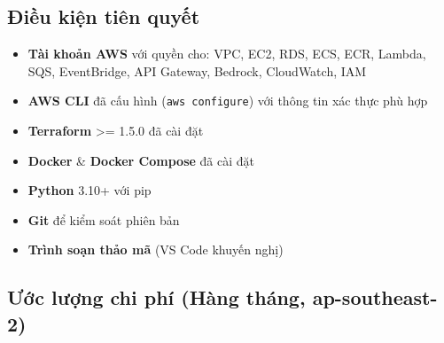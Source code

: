 \hypertarget{ux111iux1ec1u-kiux1ec7n-tiuxean-quyux1ebft}{%
\subsection{Điều kiện tiên
quyết}}

\begin{itemize}
\tightlist
\item
  \textbf{Tài khoản AWS} với quyền cho: VPC, EC2, RDS, ECS, ECR, Lambda,
  SQS, EventBridge, API Gateway, Bedrock, CloudWatch, IAM
\item
  \textbf{AWS CLI} đã cấu hình (\texttt{aws\ configure}) với thông tin
  xác thực phù hợp
\item
  \textbf{Terraform} \textgreater= 1.5.0 đã cài đặt
\item
  \textbf{Docker} \& \textbf{Docker Compose} đã cài đặt
\item
  \textbf{Python} 3.10+ với pip
\item
  \textbf{Git} để kiểm soát phiên bản
\item
  \textbf{Trình soạn thảo mã} (VS Code khuyến nghị)
\end{itemize}

\hypertarget{ux1b0ux1edbc-lux1b0ux1ee3ng-chi-phuxed-huxe0ng-thuxe1ng-ap-southeast-2}{%
\subsection{Ước lượng chi phí (Hàng tháng,
ap-southeast-2)}}

